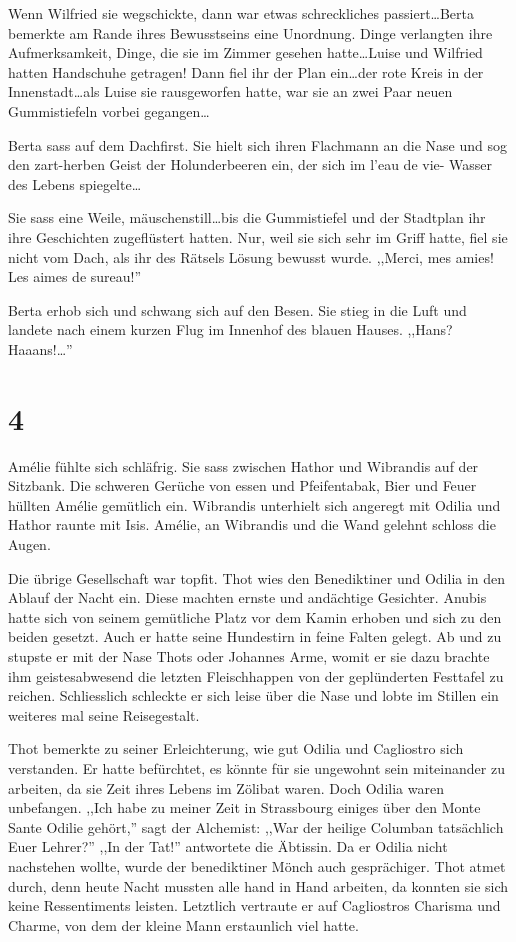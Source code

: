Wenn Wilfried sie wegschickte, dann war etwas schreckliches passiert\dots Berta bemerkte am Rande ihres Bewusstseins eine Unordnung. Dinge verlangten ihre Aufmerksamkeit, Dinge, die sie im Zimmer gesehen hatte\dots Luise und Wilfried hatten Handschuhe getragen! Dann fiel ihr der Plan ein\dots der rote Kreis in der Innenstadt\dots als Luise sie rausgeworfen hatte, war sie an zwei Paar neuen Gummistiefeln vorbei gegangen\dots

Berta sass auf dem Dachfirst. Sie hielt sich ihren Flachmann an die Nase und sog den zart-herben Geist der Holunderbeeren ein, der sich im l'eau de vie- Wasser des Lebens spiegelte\dots

Sie sass eine Weile, mäuschenstill\dots bis die Gummistiefel und der Stadtplan ihr ihre Geschichten zugeflüstert hatten. Nur, weil sie sich sehr im Griff hatte, fiel sie nicht vom Dach, als ihr des Rätsels Lösung bewusst wurde. ,,Merci, mes amies! Les aimes de sureau!''

Berta erhob sich und schwang sich auf den Besen. Sie stieg in die Luft und landete nach einem kurzen Flug im Innenhof des blauen Hauses. ,,Hans? Haaans!\dots ''

\section*{4}

Amélie fühlte sich schläfrig. Sie sass zwischen Hathor und Wibrandis auf der Sitzbank. Die schweren Gerüche von essen und Pfeifentabak, Bier und Feuer hüllten Amélie gemütlich ein. Wibrandis unterhielt sich angeregt mit Odilia und Hathor raunte mit Isis. Amélie, an Wibrandis und die Wand gelehnt schloss die Augen.

Die übrige Gesellschaft war topfit. Thot wies den Benediktiner und Odilia in den Ablauf der Nacht ein. Diese machten ernste und andächtige Gesichter. Anubis hatte sich von seinem gemütliche Platz vor dem Kamin erhoben und sich zu den beiden gesetzt. Auch er hatte seine Hundestirn in feine Falten gelegt. Ab und zu stupste er mit der Nase Thots oder Johannes Arme, womit er sie dazu brachte ihm geistesabwesend die letzten Fleischhappen von der geplünderten Festtafel zu reichen. Schliesslich schleckte er sich leise über die Nase und lobte im Stillen ein weiteres mal seine Reisegestalt.

Thot bemerkte zu seiner Erleichterung, wie gut Odilia und Cagliostro sich verstanden. Er hatte befürchtet, es könnte für sie ungewohnt sein miteinander zu arbeiten, da sie Zeit ihres Lebens im Zölibat waren. Doch Odilia waren unbefangen. ,,Ich habe zu meiner Zeit in Strassbourg einiges über den Monte Sante Odilie gehört,'' sagt der Alchemist: ,,War der heilige Columban tatsächlich Euer Lehrer?'' ,,In der Tat!'' antwortete die Äbtissin. Da er Odilia nicht nachstehen wollte, wurde der benediktiner Mönch auch gesprächiger. Thot atmet durch, denn heute Nacht mussten alle hand in Hand arbeiten, da konnten sie sich keine Ressentiments leisten. Letztlich vertraute er auf Cagliostros Charisma und Charme, von dem der kleine Mann erstaunlich viel hatte.

